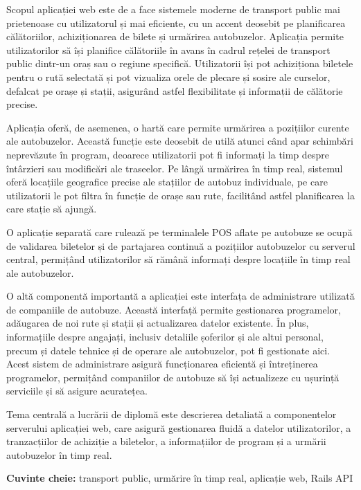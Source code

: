 
Scopul aplicației web este de a face sistemele moderne de transport public mai prietenoase cu utilizatorul și mai eficiente, cu un accent deosebit pe planificarea călătoriilor, achiziționarea de bilete și urmărirea autobuzelor. Aplicația permite utilizatorilor să își planifice călătoriile în avans în cadrul rețelei de transport public dintr-un oraș sau o regiune specifică. Utilizatorii își pot achiziționa biletele pentru o rută selectată și pot vizualiza orele de plecare și sosire ale curselor, defalcat pe orașe și stații, asigurând astfel flexibilitate și informații de călătorie precise.

Aplicația oferă, de asemenea, o hartă care permite urmărirea a pozițiilor curente ale autobuzelor. Această funcție este deosebit de utilă atunci când apar schimbări neprevăzute în program, deoarece utilizatorii pot fi informați la timp despre întârzieri sau modificări ale traseelor. Pe lângă urmărirea în timp real, sistemul oferă locațiile geografice precise ale stațiilor de autobuz individuale, pe care utilizatorii le pot filtra în funcție de orașe sau rute, facilitând astfel planificarea la care stație să ajungă.

O aplicație separată care rulează pe terminalele POS aflate pe autobuze se ocupă de validarea biletelor și de partajarea continuă a pozițiilor autobuzelor cu serverul central, permițând utilizatorilor să rămână informați despre locațiile în timp real ale autobuzelor.

O altă componentă importantă a aplicației este interfața de administrare utilizată de companiile de autobuze. Această interfață permite gestionarea programelor, adăugarea de noi rute și stații și actualizarea datelor existente. În plus, informațiile despre angajați, inclusiv detaliile șoferilor și ale altui personal, precum și datele tehnice și de operare ale autobuzelor, pot fi gestionate aici. Acest sistem de administrare asigură funcționarea eficientă și întreținerea programelor, permițând companiilor de autobuze să își actualizeze cu ușurință serviciile și să asigure acuratețea.

Tema centrală a lucrării de diplomă este descrierea detaliată a componentelor serverului aplicației web, care asigură gestionarea fluidă a datelor utilizatorilor, a tranzacțiilor de achiziție a biletelor, a informațiilor de program și a urmării autobuzelor în timp real.

\vspace{1em}
\textbf{Cuvinte cheie:} transport public, urmărire în timp real, aplicație web, Rails API
